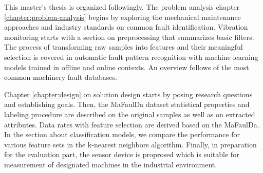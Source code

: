 This master's thesis is organized followingly. The problem analysis chapter \ref{chapter:problem-analysis} begins by exploring the mechanical maintenance approaches and industry standards on common fault identification. Vibration monitoring starts with a section on preprocessing that summarizes basic filters. The process of transforming raw samples into features and their meaningful selection is covered in automatic fault pattern recognition with machine learning models trained in offline and online contexts. An overview follows of the most common machinery fault databases. 

Chapter \ref{chapter:design} on solution design starts by posing research questions and establishing goals. Then, the MaFaulDa dataset statistical properties and labeling procedure are described on the original samples as well as on extracted attributes. Data rates with feature selection are derived based on the MaFaulDa. In the section about classification models, we compare the performance for various feature sets in the k-nearest neighbors algorithm. Finally, in preparation for the evaluation part, the sensor device is proprosed which is suitable for measurement of designated machines in the industrial environment.
